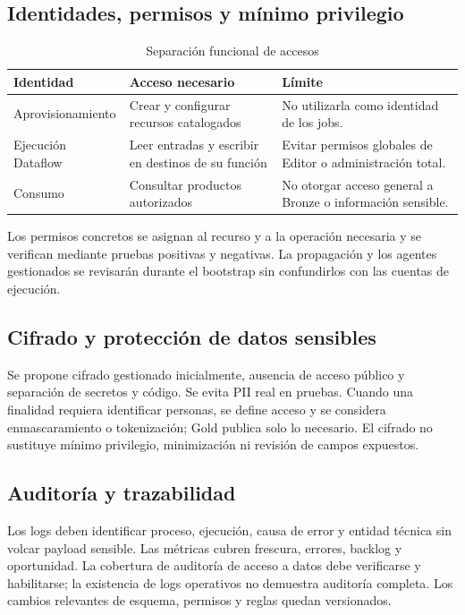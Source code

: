 \documentclass[11pt,a4paper]{article}
\begin{document}
\subsection{Identidades, permisos y mínimo privilegio}
\begin{table}[H]
\caption{Separación funcional de accesos}\label{tab:iam}
\small\begin{tabularx}{\linewidth}{@{}P{.24\linewidth}YY@{}}\toprule
Identidad & Acceso necesario & Límite\\\midrule
Aprovisionamiento & Crear y configurar recursos catalogados & No utilizarla como identidad de los jobs.\\
Ejecución Dataflow & Leer entradas y escribir en destinos de su función & Evitar permisos globales de Editor o administración total.\\
Consumo & Consultar productos autorizados & No otorgar acceso general a Bronze o información sensible.\\\bottomrule
\end{tabularx}
\end{table}
Los permisos concretos se asignan al recurso y a la operación necesaria y se verifican mediante pruebas positivas y negativas. La propagación y los agentes gestionados se revisarán durante el bootstrap sin confundirlos con las cuentas de ejecución.

\subsection{Cifrado y protección de datos sensibles}
Se propone cifrado gestionado inicialmente, ausencia de acceso público y separación de secretos y código. Se evita PII real en pruebas. Cuando una finalidad requiera identificar personas, se define acceso y se considera enmascaramiento o tokenización; Gold publica solo lo necesario. El cifrado no sustituye mínimo privilegio, minimización ni revisión de campos expuestos.

\subsection{Auditoría y trazabilidad}
Los logs deben identificar proceso, ejecución, causa de error y entidad técnica sin volcar payload sensible. Las métricas cubren frescura, errores, backlog y oportunidad. La cobertura de auditoría de acceso a datos debe verificarse y habilitarse; la existencia de logs operativos no demuestra auditoría completa. Los cambios relevantes de esquema, permisos y reglas quedan versionados.
\end{document}
